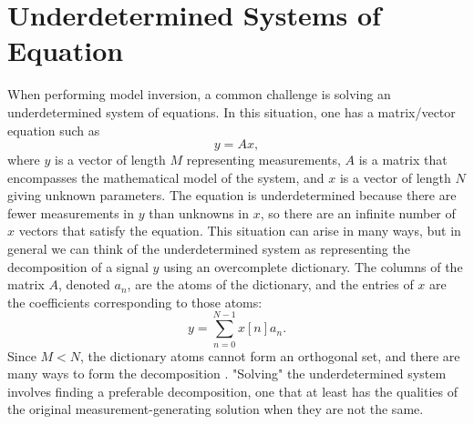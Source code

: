 \section{Underdetermined Systems of Equation}
\label{underdetermined_systems}
When performing model inversion, a common challenge is solving an underdetermined system of equations. In this situation, one has a matrix/vector equation such as
\begin{equation}
 y = Ax,
\end{equation}
where $y$ is a vector of length $M$ representing measurements, $A$ is a matrix that encompasses the mathematical model of the system, and $x$ is a vector of length $N$ giving unknown parameters. The equation is underdetermined because there are fewer measurements in $y$ than unknowns in $x$, so there are an infinite number of $x$ vectors that satisfy the equation. This situation can arise in many ways, but in general we can think of the underdetermined system as representing the decomposition of a signal $y$ using an overcomplete dictionary. The columns of the matrix $A$, denoted $a_n$, are the atoms of the dictionary, and the entries of $x$ are the coefficients corresponding to those atoms:
\begin{equation}
 y = \sum_{n=0}^{N-1} x[n] a_n.
\end{equation}
Since $M < N$, the dictionary atoms cannot form an orthogonal set, and there are many ways to form the decomposition \autocite{Mal08}. "Solving" the underdetermined system involves finding a preferable decomposition, one that at least has the qualities of the original measurement-generating solution when they are not the same.

